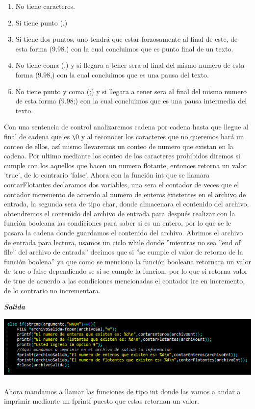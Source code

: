 \documentclass[12pt,letterpaper]{report}
\begin{document}
\begin{enumerate}
\item No tiene caracteres.
\item Si tiene punto (.) 
\item Si tiene dos puntos, uno tendrá que estar forzosamente al final de este, de esta forma (9.98.) con la cual concluimos que es punto final de un texto.
\item No tiene coma (,)  y si llegara a tener sera al final del mismo numero de esta forma (9.98,) con la cual concluimos que es una pausa del texto.
\item No tiene punto y coma (;)  y si llegara a tener sera al final del mismo numero de esta forma (9.98;) con la cual concluimos que es una pausa intermedia del texto.

\end{enumerate}
Con una sentencia de control analizaremos cadena por cadena hasta que llegue al final de cadena que es \verb'\'0 y al reconocer los caracteres que no queremos hará un conteo de ellos, así mismo llevaremos un conteo de numero que existan en la cadena. Por ultimo mediante los conteo de los caracteres prohibidos diremos si cumple con los aquellos que hacen un numero flotante, entonces retorna un valor 'true', de lo contrario 'false'.
Ahora con la función int que se llamara contarFlotantes declaramos dos variables, una sera el contador de veces que el contador incremento de acuerdo al numero de enteros existentes en el archivo de entrada, la segunda sera de tipo char, donde almacenara el contenido del archivo, obtendremos el contenido del archivo de entrada para después realizar con la función booleana las condiciones para saber si es un entero, por lo que se le pasara la cadena donde guardamos el contenido del archivo.
Abrimos el archivo de entrada para lectura, usamos un ciclo while donde ''mientras no sea ''end of file'' del archivo de entrada'' decimos que si ''se cumple el valor de retorno de la función boolena'' ya que como se menciono la función booleana retornara un valor de true o false dependiendo se si se cumple la funcion, por lo que si retorna valor de true de acuerdo a las condiciones mencionadas el contador ire en incremento, de lo contrario no incrementara.\\

\newpage

\textbf{\textit{\em{Salida}}}
\begin{multicols}{2}

\includegraphics[scale=0.5]{punto9-imprimir}\\\\
Ahora mandamos a llamar las funciones de tipo int donde las vamos a andar a imprimir mediante un fprintf puesto que estas retornan un valor.
\end{multicols}
\end{document}
